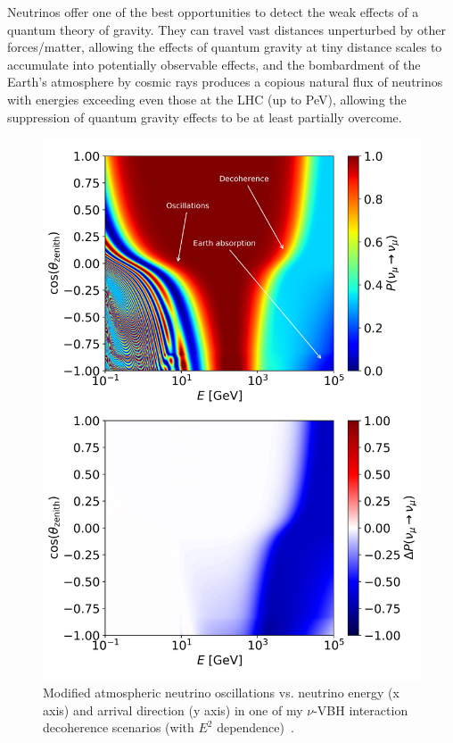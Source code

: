 \documentclass[a4paper,11pt]{article}
\newcounter{bar}
\begin{document}
Neutrinos offer one of the best opportunities to detect the weak effects of a quantum theory of gravity. They can travel vast distances unperturbed by other forces/matter, allowing the effects of quantum gravity at tiny distance scales to accumulate into potentially observable effects, and the bombardment of the Earth's atmosphere by cosmic rays produces a copious natural flux of neutrinos with energies exceeding even those at the LHC (up to PeV), allowing the suppression of quantum gravity effects to be at least partially overcome. 

\begin{figure} %
    \centering
    \vspace{-7pt}
    \includegraphics[trim=0.0cm 12.7cm 0.cm 0.2cm, clip=true, width=1.\linewidth]{images/atmo_oscillogram_randomize_flavor_n2_matter.png}
    \caption{Modified atmospheric neutrino oscillations vs. neutrino energy (x axis) and arrival direction (y axis) in one of my $\nu$-VBH interaction decoherence scenarios (with $E^2$ dependence)~\cite{PhysRevD.102.115003}.}
    \vspace{-5pt}
    \label{fig:decoh_oscillogram}
\end{figure}
\end{document}
